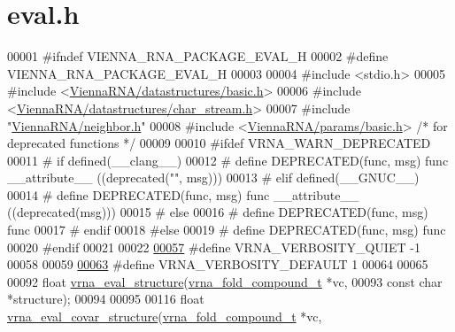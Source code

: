 \hypertarget{eval_8h_source}{}\section{eval.\+h}
\label{eval_8h_source}

\begin{DoxyCode}
00001 \textcolor{preprocessor}{#ifndef VIENNA\_RNA\_PACKAGE\_EVAL\_H}
00002 \textcolor{preprocessor}{#define VIENNA\_RNA\_PACKAGE\_EVAL\_H}
00003 
00004 \textcolor{preprocessor}{#include <stdio.h>}
00005 \textcolor{preprocessor}{#include <\hyperlink{datastructures_2basic_8h}{ViennaRNA/datastructures/basic.h}>}
00006 \textcolor{preprocessor}{#include <\hyperlink{datastructures_2char__stream_8h}{ViennaRNA/datastructures/char\_stream.h}>}
00007 \textcolor{preprocessor}{#include "\hyperlink{neighbor_8h}{ViennaRNA/neighbor.h}"}
00008 \textcolor{preprocessor}{#include <\hyperlink{params_2basic_8h}{ViennaRNA/params/basic.h}>}   \textcolor{comment}{/* for deprecated functions */}
00009 
00010 \textcolor{preprocessor}{#ifdef VRNA\_WARN\_DEPRECATED}
00011 \textcolor{preprocessor}{# if defined(\_\_clang\_\_)}
00012 \textcolor{preprocessor}{#  define DEPRECATED(func, msg) func \_\_attribute\_\_ ((deprecated("", msg)))}
00013 \textcolor{preprocessor}{# elif defined(\_\_GNUC\_\_)}
00014 \textcolor{preprocessor}{#  define DEPRECATED(func, msg) func \_\_attribute\_\_ ((deprecated(msg)))}
00015 \textcolor{preprocessor}{# else}
00016 \textcolor{preprocessor}{#  define DEPRECATED(func, msg) func}
00017 \textcolor{preprocessor}{# endif}
00018 \textcolor{preprocessor}{#else}
00019 \textcolor{preprocessor}{# define DEPRECATED(func, msg) func}
00020 \textcolor{preprocessor}{#endif}
00021 
00022 
\hyperlink{group__eval_gaf4afe19780b61b4962c613bde324128b}{00057} \textcolor{preprocessor}{#define VRNA\_VERBOSITY\_QUIET     -1}
00058 
00059 
\hyperlink{group__eval_ga47430d9e875084cfb983b22612e3abdf}{00063} \textcolor{preprocessor}{#define VRNA\_VERBOSITY\_DEFAULT    1}
00064 
00065 
00092 \textcolor{keywordtype}{float} \hyperlink{group__eval_ga58f199f1438d794a265f3b27fc8ea631}{vrna\_eval\_structure}(\hyperlink{group__fold__compound_structvrna__fc__s}{vrna\_fold\_compound\_t}  *vc,
00093                           \textcolor{keyword}{const} \textcolor{keywordtype}{char}            *structure);
00094 
00095 
00116 \textcolor{keywordtype}{float} \hyperlink{group__eval_ga6cea75c0eb9857fb59172be54cab09e0}{vrna\_eval\_covar\_structure}(\hyperlink{group__fold__compound_structvrna__fc__s}{vrna\_fold\_compound\_t}  *vc,

\end{DoxyCode}

